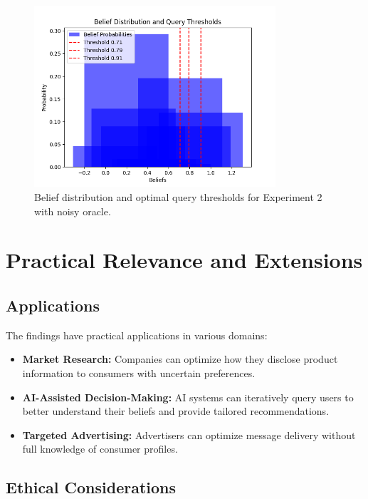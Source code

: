 \documentclass[12pt]{article}
\begin{document}
\begin{figure}[H]
    \centering
    \includegraphics[width=0.8\textwidth]{Figure_2.png}
    \caption{Belief distribution and optimal query thresholds for Experiment 2 with noisy oracle.}
    \label{fig:experiment2}
\end{figure}

\section{Practical Relevance and Extensions}

\subsection{Applications}

The findings have practical applications in various domains:

\begin{itemize}
    \item \textbf{Market Research:} Companies can optimize how they disclose product information to consumers with uncertain preferences.
    \item \textbf{AI-Assisted Decision-Making:} AI systems can iteratively query users to better understand their beliefs and provide tailored recommendations.
    \item \textbf{Targeted Advertising:} Advertisers can optimize message delivery without full knowledge of consumer profiles.
\end{itemize}

\subsection{Ethical Considerations}
\end{document}
